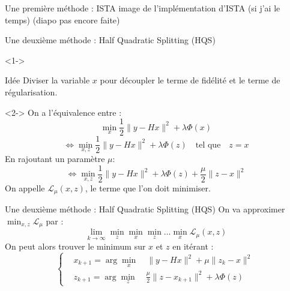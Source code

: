 \documentclass[11pt]{beamer}
\begin{document}
\begin{frame}{Une première méthode : ISTA}
    image de l'implémentation d'ISTA (si j'ai le temps) (diapo pas encore faite)
\end{frame}

\begin{frame}{Une deuxième méthode : Half Quadratic Splitting (HQS)}
    \begin{visibleenv}<1->
        \begin{exampleblock}{Idée}
            Diviser la variable $x$ pour découpler le terme de fidélité et le terme de régularisation.
        \end{exampleblock}
    \end{visibleenv}
    \begin{visibleenv}<2->
        On a l'équivalence entre :
        $$ \min_x \frac{1}{2}\lVert y-Hx \rVert^2 + \lambda \Phi(x) $$
        $$ \Leftrightarrow \min_{x, z} \frac{1}{2}\lVert y-Hx \rVert ^2 + \lambda \Phi(z) \quad \text{tel que} \quad  z=x$$
        En rajoutant un paramètre $\mu$:
        $$ \Leftrightarrow \min_{x, z}  \frac{1}{2}\lVert y-Hx \rVert ^2+\lambda \Phi(z) + \frac{\mu}{2}\lVert z-x \rVert ^2 $$
        On appelle $\mathcal{L}_{\mu}(x,z)$, le terme que l'on doit minimiser.
    \end{visibleenv}
\end{frame}

\begin{frame}{Une deuxième méthode : Half Quadratic Splitting (HQS)}
    On va approximer $\displaystyle \min_{x, z} \mathcal{L}_{\mu}$ par :
    $$ \lim_{k \rightarrow \infty} \min_z \min_x \min_z \dots \min_x \mathcal{L}_{\mu}(x,z)$$
    On peut alors trouver le minimum sur $x$ et $z$ en itérant :
    \begin{equation*}
        \left\{
        \begin{aligned}
            & x_{k+1} = \arg \min_x \quad \lVert y - Hx \rVert^2 + \mu \lVert z_k - x \rVert^2 \\
            & z_{k+1} = \arg \min_z \quad \frac{\mu}{2}\lVert z - x_{k+1} \rVert^2 + \lambda \Phi(z)
        \end{aligned}
        \right.
    \end{equation*}
\end{frame}
\end{document}
